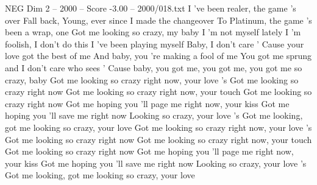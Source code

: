 \begin{textsample}{NEG Dim 2 – 2000 – Score -3.00 – 2000/018.txt}
I 've been realer, the game 's over Fall back, Young, ever since I made the changeover To Platinum, the game 's been a wrap, one Got me looking so crazy, my baby I 'm not myself lately I 'm foolish, I don't do this I 've been playing myself Baby, I don't care ' Cause your love got the best of me And baby, you 're making a fool of me You got me sprung and I don't care who sees ' Cause baby, you got me, you got me, you got me so crazy, baby Got me looking so crazy right now, your love 's Got me looking so crazy right now Got me looking so crazy right now, your touch Got me looking so crazy right now Got me hoping you 'll page me right now, your kiss Got me hoping you 'll save me right now Looking so crazy, your love 's Got me looking, got me looking so crazy, your love Got me looking so crazy right now, your love 's Got me looking so crazy right now Got me looking so crazy right now, your touch Got me looking so crazy right now Got me hoping you 'll page me right now, your kiss Got me hoping you 'll save me right now Looking so crazy, your love 's Got me looking, got me looking so crazy, your love

\end{textsample}
